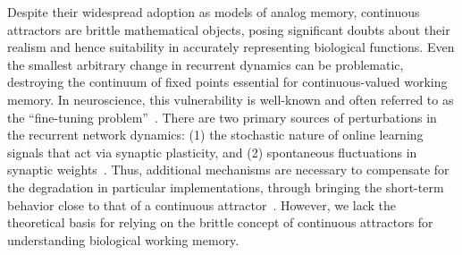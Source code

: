 \documentclass{article} %
\newcounter{ct}
\theoremstyle{definition}
\theoremstyle{remark}
\renewcommand{\cite}{\citep}
\begin{document}


Despite their widespread adoption as models of analog memory, continuous attractors are brittle mathematical objects, posing significant doubts about their realism and hence suitability in accurately representing biological functions.
Even the smallest arbitrary change in recurrent dynamics can be problematic, destroying the continuum of fixed points essential for continuous-valued working memory.
In neuroscience, this vulnerability is well-known and often referred to as the ``fine-tuning problem''~\cite{seung1996,Renart2003,Park2023a}.
There are two primary sources of perturbations in the recurrent network dynamics:
(1) the stochastic nature of online learning signals that act via synaptic plasticity, and
(2) spontaneous fluctuations in synaptic weights~\cite{Fusi2007-yg,shimizu2021}.
Thus, additional mechanisms are necessary to compensate for the degradation in particular implementations, through bringing the short-term behavior close to that of a continuous attractor~\cite{Lim2012,Lim2013,Boerlin2013,Koulakov2002,Renart2003,gu2022}.
However, we lack the theoretical basis for relying on the brittle concept of continuous attractors for understanding biological working memory.
\end{document}
